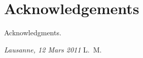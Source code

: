\chapter*{Acknowledgements}

Acknowledgments.

\bigskip
 
\noindent\textit{Lausanne, 12 Mars 2011}
\hfill L.~M.

